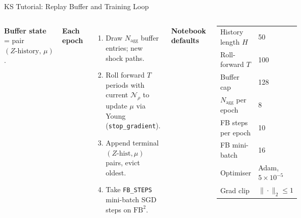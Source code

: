\documentclass[aspectratio=169,11pt]{beamer}
\begin{document}
\begin{frame}{KS Tutorial: Replay Buffer and Training Loop}
\small
\begin{columns}[T]
\textbf{Buffer state} = pair $(Z\text{-history},\,\mu)$.

\smallskip
\textbf{Each epoch}
\begin{enumerate}\itemsep2pt
    \item Draw $N_{\text{agg}}$ buffer entries; new shock paths.
    \item Roll forward $T$ periods with current $\mathcal{N}_\rho$ to update $\mu$ via Young (\texttt{stop\_gradient}).
    \item Append terminal $(Z\text{-hist},\mu)$ pairs, evict oldest.
    \item Take \texttt{FB\_STEPS} mini-batch SGD steps on $\mathrm{FB}^2$.
\end{enumerate}

\textbf{Notebook defaults}
\begin{center}\renewcommand{\arraystretch}{0.95}
{\footnotesize
\begin{tabular}{ll}
\toprule
History length $H$ & 50\\
Roll-forward $T$   & 100\\
Buffer cap         & 128\\
$N_{\text{agg}}$ per epoch & 8\\
FB steps per epoch & 10\\
FB mini-batch      & 16\\
Optimiser          & Adam, $5\!\times\!10^{-5}$\\
Grad clip          & $\|\cdot\|_2 \le 1$\\
\bottomrule
\end{tabular}}
\end{center}
\end{columns}
\end{frame}


\end{document}

